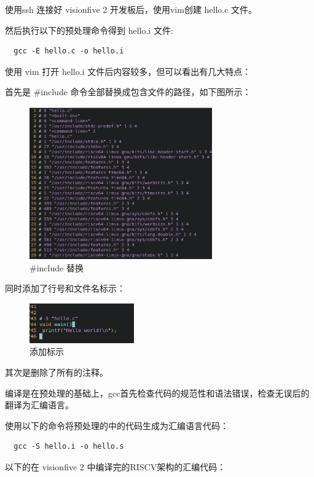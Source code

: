 \documentclass[lang=cn,10pt]{elegantbook}
\begin{document}
使用ssh 连接好 visionfive 2 开发板后，使用vim创建 hello.c 文件。

然后执行以下的预处理命令得到 hello.i 文件:

\begin{lstlisting}
  gcc -E hello.c -o hello.i
\end{lstlisting}

使用 vim 打开 hello.i 文件后内容较多，但可以看出有几大特点：

首先是 \#include 命令全部替换成包含文件的路径，如下图所示：
\begin{figure}[htbp]
  \centering
  \includegraphics[width=0.7\textwidth]{image/image-20231108152215370.png}
  \caption{ \#include 替换}
\end{figure}


同时添加了行号和文件名标示：
\begin{figure}[htbp]
  \centering
  \includegraphics[width=0.4\textwidth]{image/image-20231108152332267.png}
  \caption{添加标示}
\end{figure}


其次是删除了所有的注释。

编译是在预处理的基础上，gcc首先检查代码的规范性和语法错误，检查无误后的翻译为汇编语言。

使用以下的命令将预处理的中的代码生成为汇编语言代码：

\begin{lstlisting}
  gcc -S hello.i -o hello.s
\end{lstlisting}

以下的在 visionfive 2 中编译完的RISCV架构的汇编代码：
\end{document}
